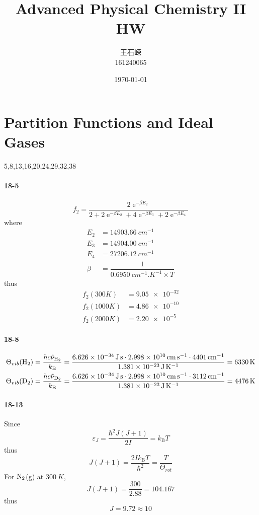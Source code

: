 \documentclass[a4paper]{article}
\title{\textbf{Advanced Physical Chemistry II}\\HW}
\author{王石嵘
\vspace{5pt}\\
161240065\\
}
\date{\today} %
\DeclareMathOperator{\e}{\mathrm{e}}
\newcommand{\kB}{k_\mathrm{B}}
\newcommand{\ex}[1]{\paragraph{18-#1}}
\numberwithin{equation}{section}
\begin{document}

\maketitle



\setcounter{section}{17}
\section{Partition Functions and Ideal Gases}
5,8,13,16,20,24,29,32,38\\
\ex{5}
\begin{equation}\label{key}
f_2 = \dfrac{2\e^{-\beta E_2}}{2 + 2\e^{-\beta E_2} + 4\e^{-\beta E_3} + 2\e^{-\beta E_4}}
\end{equation}
where
\begin{align}
E_2 &= \SI{14903.66}{cm^{-1}}\\
E_3 &= \SI{14904.00}{cm^{-1}}\\
E_4 &= \SI{27206.12}{cm^{-1}}\\
\beta & = \dfrac{1}{\SI{0.6950}{cm^{-1}.K^{-1}}\times T}
\end{align}
thus
\begin{align}
f_2(300K) & = \num{9.05e-32}\\
f_2(1000K) &= \num{4.86e-10}\\
f_2(2000K) &= \num{2.20e-5}
\end{align}

\ex{8}
\begin{align}
\Theta_{vib}(\ce{H_2}) &= \dfrac{hc\tilde{\nu}_{\ce{H_2}}}{\kB} = \dfrac{\SI{6.626e-34}{J.s}\cdot \SI{2.998e10}{cm.s^{-1}}\cdot \SI{4401}{cm^{-1}}}{\SI{1.381e-23}{J.K^{-1}}} = \SI{6330}{K}\\
\Theta_{vib}(\ce{D_2}) &= \dfrac{hc\tilde{\nu}_{\ce{D_2}}}{\kB} = \dfrac{\SI{6.626e-34}{J.s}\cdot \SI{2.998e10}{cm.s^{-1}}\cdot \SI{3112}{cm^{-1}}}{\SI{1.381e-23}{J.K^{-1}}} = \SI{4476}{K}
\end{align}

\ex{13}
Since
\begin{equation}\label{key}
\varepsilon_J = \dfrac{\hbar^2 J(J+1)}{2I} = \kB T
\end{equation}
thus
\begin{equation}\label{key}
J(J+1) = \dfrac{2I \kB T}{\hbar^2} = \dfrac{T}{\Theta_{rot}} 
\end{equation}
For $ \ce{N_2} $(g) at $ \SI{300}{K} $,
\begin{equation}\label{key}
J(J+1) = \dfrac{300}{2.88} = 104.167
\end{equation}
thus
\begin{equation}\label{key}
J = 9.72\approx 10
\end{equation}
\end{document}
